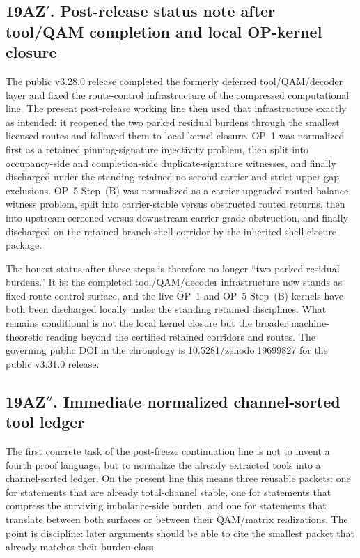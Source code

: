 \subsection*{19AZ$\prime$. Post-release status note after tool/QAM completion and local OP-kernel closure}
The public v3.28.0 release completed the formerly deferred tool/QAM/decoder layer and fixed the route-control infrastructure of the compressed computational line. The present post-release working line then used that infrastructure exactly as intended: it reopened the two parked residual burdens through the smallest licensed routes and followed them to local kernel closure. OP~1 was normalized first as a retained pinning-signature injectivity problem, then split into occupancy-side and completion-side duplicate-signature witnesses, and finally discharged under the standing retained no-second-carrier and strict-upper-gap exclusions. OP~5 Step~(B) was normalized as a carrier-upgraded routed-balance witness problem, split into carrier-stable versus obstructed routed returns, then into upstream-screened versus downstream carrier-grade obstruction, and finally discharged on the retained branch-shell corridor by the inherited shell-closure package.

The honest status after these steps is therefore no longer ``two parked residual burdens.'' It is: the completed tool/QAM/decoder infrastructure now stands as fixed route-control surface, and the live OP~1 and OP~5 Step~(B) kernels have both been discharged locally under the standing retained disciplines. What remains conditional is not the local kernel closure but the broader machine-theoretic reading beyond the certified retained corridors and routes. The governing public DOI in the chronology is \href{https://doi.org/10.5281/zenodo.19699827}{10.5281/zenodo.19699827} for the public v3.31.0 release.

\subsection*{19AZ$''$. Immediate normalized channel-sorted tool ledger}
\label{sec:immediate-normalized-tool-ledger}
The first concrete task of the post-freeze continuation line is not to invent a fourth proof language, but to normalize the already extracted tools into a channel-sorted ledger. On the present line this means three reusable packets: one for statements that are already total-channel stable, one for statements that compress the surviving imbalance-side burden, and one for statements that translate between both surfaces or between their QAM/matrix realizations. The point is discipline: later arguments should be able to cite the smallest packet that already matches their burden class.

